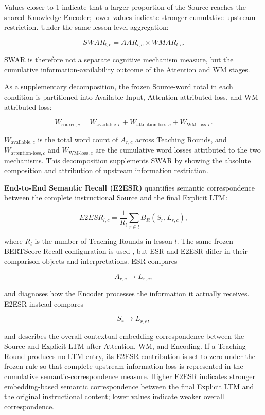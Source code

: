Values closer to 1 indicate that a larger proportion of the Source reaches the shared Knowledge Encoder; lower values indicate stronger cumulative upstream restriction. Under the same lesson-level aggregation:

\[
SWAR_{l,c}
=
AAR_{l,c}
\times
WMAR_{l,c}.
\]

SWAR is therefore not a separate cognitive mechanism measure, but the cumulative information-availability outcome of the Attention and WM stages.

As a supplementary decomposition, the frozen Source-word total in each condition is partitioned into Available Input, Attention-attributed loss, and WM-attributed loss:

\[
W_{\text{source},c}
=
W_{\text{available},c}
+
W_{\text{attention-loss},c}
+
W_{\text{WM-loss},c}.
\]

$W_{\text{available},c}$ is the total word count of $A_{r,c}$ across Teaching Rounds, and $W_{\text{attention-loss},c}$ and $W_{\text{WM-loss},c}$ are the cumulative word losses attributed to the two mechanisms. This decomposition supplements SWAR by showing the absolute composition and attribution of upstream information restriction.

\textbf{End-to-End Semantic Recall (E2ESR)} quantifies semantic correspondence between the complete instructional Source and the final Explicit LTM:

\[
E2ESR_{l,c}
=
\frac{1}{R_l}
\sum_{r\in l}
B_R(S_r,L_{r,c}),
\]

where $R_l$ is the number of Teaching Rounds in lesson $l$. The same frozen BERTScore Recall configuration is used \cite{zhang2019bertscore}, but ESR and E2ESR differ in their comparison objects and interpretations. ESR compares

\[
A_{r,c}\rightarrow L_{r,c},
\]

and diagnoses how the Encoder processes the information it actually receives. E2ESR instead compares

\[
S_r\rightarrow L_{r,c},
\]

and describes the overall contextual-embedding correspondence between the Source and Explicit LTM after Attention, WM, and Encoding. If a Teaching Round produces no LTM entry, its E2ESR contribution is set to zero under the frozen rule so that complete upstream information loss is represented in the cumulative semantic-correspondence measure. Higher E2ESR indicates stronger embedding-based semantic correspondence between the final Explicit LTM and the original instructional content; lower values indicate weaker overall correspondence.

